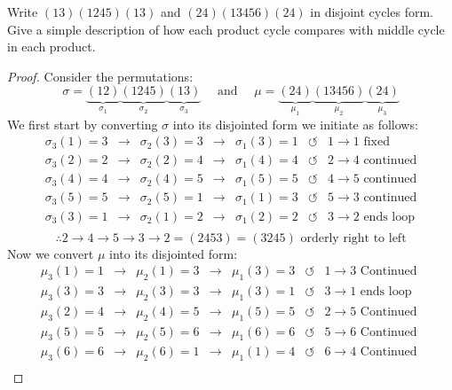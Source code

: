 \begin{assignment}[
  header=HeaderA,
  body=BodyA,
  title={Homework 3},
  duedate={26 February, 2026},
  toc=false,
  toctitle={This appears on the Table of contents.},
  exlist=false
]
\begin{exer}[Problem 5.10]
Write $(13)(1245)(13)$ and $(24)(13456)(24)$ in disjoint cycles form. Give  a simple description of how each product cycle compares with middle cycle in each product. 
\begin{proof}
 Consider the permutations:
 \[
 \sigma = \underbrace{(12)}_{\sigma_1}\underbrace{(1245)}_{\sigma_2}\underbrace{(13)}_{\sigma_3} \quad \text{ and } \quad \mu = \underbrace{(24)}_{\mu_1}\underbrace{(13456)}_{\mu_2}\underbrace{(24)}_{\mu_3}
 \]
 We first start by converting $\sigma$ into its disjointed form we initiate as follows:
\[
\begin{array}{lclclcl}
    \sigma_3(1) = 3 & \rightarrow & \sigma_2(3) = 3 & \rightarrow & \sigma_1(3) = 1 & \circlearrowleft & 1 \to 1  \text{ fixed }\\
    \sigma_3(2) = 2 & \rightarrow & \sigma_2(2) = 4 & \rightarrow & \sigma_1(4) = 4 & \circlearrowleft & 2 \to 4 \text{ continued}  \\
    \sigma_3(4) = 4 & \rightarrow & \sigma_2(4) = 5 & \rightarrow & \sigma_1(5) = 5 & \circlearrowleft & 4 \to 5 \text{ continued}  \\
    \sigma_3(5) = 5 & \rightarrow & \sigma_2(5) = 1 & \rightarrow & \sigma_1(1) = 3 & \circlearrowleft & 5 \to 3 \text{ continued}  \\
    \sigma_3(3) = 1 & \rightarrow & \sigma_2(1) = 2 & \rightarrow & \sigma_1(2) = 2 & \circlearrowleft & 3 \to 2 \text{ ends loop}  \\
\end{array}
 \]
 \[
 \therefore 2 \to 4 \to 5 \to 3 \to 2 = (2453) = (3245) \text{ orderly right to left}
 \]
 Now we convert $\mu$ into its disjointed form:
 \[
\begin{array}{lclclcl}
    \mu_3(1) = 1 & \rightarrow & \mu_2(1) = 3 & \rightarrow & \mu_1(3) = 3 & \circlearrowleft & 1 \to 3  \text{ Continued }\\
    \mu_3(3) = 3 & \rightarrow & \mu_2(3) = 3 & \rightarrow & \mu_1(3) = 1 & \circlearrowleft & 3 \to 1  \text{ ends loop }\\
    \mu_3(2) = 4 & \rightarrow & \mu_2(4) = 5 & \rightarrow & \mu_1(5) = 5 & \circlearrowleft & 2 \to 5  \text{ Continued }\\
    \mu_3(5) = 5 & \rightarrow & \mu_2(5) = 6 & \rightarrow & \mu_1(6) = 6 & \circlearrowleft & 5 \to 6  \text{ Continued }\\
    \mu_3(6) = 6 & \rightarrow & \mu_2(6) = 1 & \rightarrow & \mu_1(1) = 4 & \circlearrowleft & 6 \to 4  \text{ Continued }\\

\end{array}\]
\end{proof}
\end{exer}
\end{assignment}

